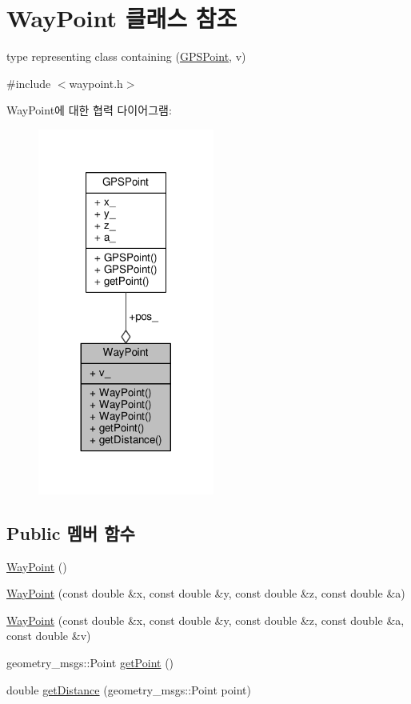 \hypertarget{class_way_point}{}\section{Way\+Point 클래스 참조}
\label{class_way_point}


type representing class containing (\hyperlink{class_g_p_s_point}{G\+P\+S\+Point}, v)  




{\ttfamily \#include $<$waypoint.\+h$>$}



Way\+Point에 대한 협력 다이어그램\+:\nopagebreak
\begin{figure}[H]
\begin{center}
\leavevmode
\includegraphics[width=164pt]{class_way_point__coll__graph}
\end{center}
\end{figure}
\subsection*{Public 멤버 함수}
\begin{DoxyCompactItemize}
\item 
\hyperlink{class_way_point_a0388a615719454d38b5a8160d8058550}{Way\+Point} ()
\item 
\hyperlink{class_way_point_a0a5358f5f8894bf9bc0279e4758f712d}{Way\+Point} (const double \&x, const double \&y, const double \&z, const double \&a)
\item 
\hyperlink{class_way_point_afb55bf3008e6df983912ca195a4994e1}{Way\+Point} (const double \&x, const double \&y, const double \&z, const double \&a, const double \&v)
\item 
geometry\+\_\+msgs\+::\+Point \hyperlink{class_way_point_a3d0e6433de5c74a13be5f6f276d0a71d}{get\+Point} ()
\item 
double \hyperlink{class_way_point_ad2b8fa2161cb6dfa5d7ff8f993f1c62c}{get\+Distance} (geometry\+\_\+msgs\+::\+Point point)
\end{DoxyCompactItemize}
